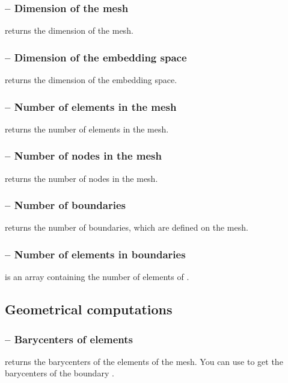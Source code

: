 \documentclass[twoside,11pt,a4paper]{article} %
\begin{document}
\subsubsection*{\texorpdfstring{ --}{} Dimension of the mesh}
 returns the dimension of the mesh.
\subsubsection*{\texorpdfstring{ --}{} Dimension of the embedding space}
 returns the dimension of the embedding space.
\subsubsection*{\texorpdfstring{ --}{} Number of elements in the mesh}
 returns the number of elements in the mesh.
\subsubsection*{\texorpdfstring{ --}{} Number of nodes in the mesh}
 returns the number of nodes in the mesh.
\subsubsection*{\texorpdfstring{ --}{} Number of boundaries}
 returns the number of boundaries, which are defined on the mesh.
\subsubsection*{\texorpdfstring{ --}{} Number of elements in boundaries}
 is an array containing the number of elements  of .

\subsection{Geometrical computations}
\subsubsection*{\texorpdfstring{ --}{} Barycenters of elements}
 returns the barycenters of the elements of the mesh.
You can use  to get the barycenters of the boundary .
\end{document}

